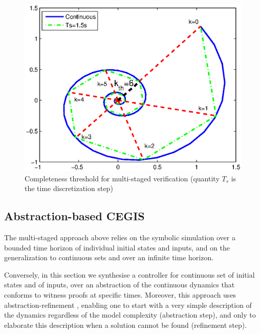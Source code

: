 \documentclass[twocolumn]{autart}    %
\renewcommand{\note}[1]{\textcolor{red}{[#1]}}
\begin{document}
\begin{figure}[t]
\centering
\includegraphics[width=\columnwidth]{figures/ct.eps}
\caption{Completeness threshold for multi-staged verification (quantity $T_s$ is the time discretization step) }
\label{fig:ct}
\end{figure}


\ifx\axelerator
\subsection{Abstraction-based CEGIS} 
\label{sssec:abstraction}


The multi-staged approach above relies on the symbolic simulation over a bounded time horizon of individual initial states and inputs, 
and on the generalization to continuous sets and over an infinite time horizon. 


Conversely, in this section we synthesise a controller for continuous set of initial states and of inputs, 
over an abstraction of the continuous dynamics \cite{cattaruzza2015unbounded} that conforms to witness proofs at specific times.   
Moreover, this approach uses abstraction-refinement \cite{DBLP:conf/cav/ClarkeGJLV00},  
enabling one to start with a very simple description of the dynamics regardless of the model complexity (abstraction step), 
and only to elaborate this description 
when a solution cannot be found (refinement step). 
\end{document}

